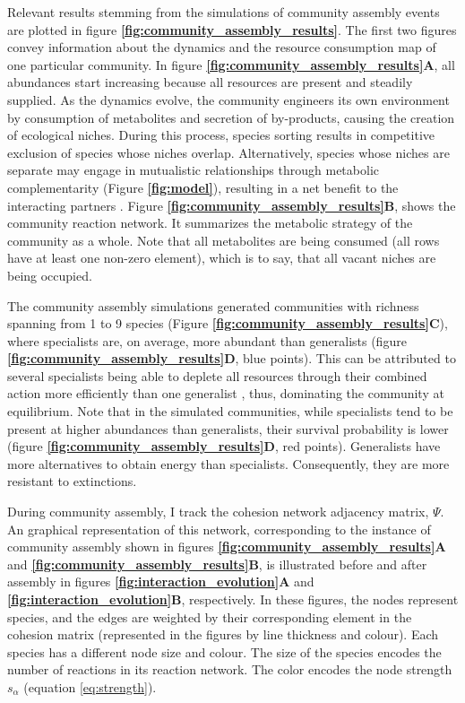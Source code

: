 \documentclass[titlepage,11pt]{article}
\begin{document}
\begin{linenumbers}
			\hspace{15pt}Relevant results stemming from the simulations of community assembly events are plotted in figure \textbf{\ref{fig:community_assembly_results}}. The first two figures convey information about the dynamics and the resource consumption map of one particular community. In figure \textbf{\ref{fig:community_assembly_results}A}, all abundances start increasing because all resources are present and steadily supplied. As the dynamics evolve, the community engineers its own environment by consumption of metabolites and secretion of by-products, causing the creation of ecological niches. During this process, species sorting results in competitive exclusion of species whose niches overlap. Alternatively, species whose niches are separate may engage in mutualistic relationships through metabolic complementarity (Figure \textbf{\ref{fig:model}}), resulting in a net benefit to the interacting partners \citep{Pascual-Garcia2020}. Figure \textbf{\ref{fig:community_assembly_results}B}, shows the community reaction network. It summarizes the metabolic strategy of the community as a whole. Note that all metabolites are being consumed (all rows have at least one non-zero element), which is to say, that all vacant niches are being occupied.\par
			The community assembly simulations generated communities with richness spanning from 1 to 9 species (Figure \textbf{\ref{fig:community_assembly_results}C}), where specialists are, on average, more abundant than generalists (figure \textbf{\ref{fig:community_assembly_results}D}, blue points). This can be attributed to several specialists being able to deplete all resources through their combined action more efficiently than one generalist \citep{Pascual-Garcia2020}, thus, dominating the community at equilibrium. Note that in the simulated communities, while specialists tend to be present at higher abundances than generalists, their survival probability is lower (figure \textbf{\ref{fig:community_assembly_results}D}, red points). Generalists have more alternatives to obtain energy than specialists. Consequently, they are more resistant to extinctions.\par
			During community assembly, I track the cohesion network adjacency matrix, $ \Psi $. An graphical representation of this network, corresponding to the instance of community assembly shown in figures \textbf{\ref{fig:community_assembly_results}A} and \textbf{\ref{fig:community_assembly_results}B}, is illustrated before and after assembly in figures \textbf{\ref{fig:interaction_evolution}A} and \textbf{\ref{fig:interaction_evolution}B}, respectively. In these figures, the nodes represent species, and the edges are weighted by their corresponding element in the cohesion matrix (represented in the figures by line thickness and colour). Each species has a different node size and colour. The size of the species encodes the number of reactions in its reaction network. The color encodes the node strength $ s_{\alpha} $ (equation \ref{eq:strength}).

\end{linenumbers}
\end{document}
